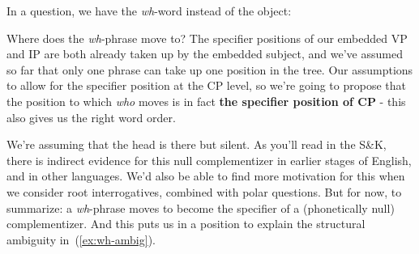 \documentclass{article}
\begin{document}
In a question, we have the \emph{wh}-word instead of the object:

\ea
    \label{wonder_who_A}
    \label{wonder_who_B}
    \z
\z

Where does the \emph{wh}-phrase move to? The specifier positions of our embedded VP and IP are both already taken up by the embedded subject, and we've assumed so far that only one phrase can take up one position in the tree. Our assumptions to allow for the specifier position at the CP level, so we're going to propose that the position to which \emph{who} moves is in fact \textbf{the specifier position of CP} - this also gives us the right word order.
\begin{exe}
\end{exe}
\vspace{-4em}
We're assuming that the head  is there but silent. As you'll read in the S\&K, there is indirect evidence for this null complementizer in earlier stages of English, and in other languages.
We'd also be able to find more motivation for this when we consider root interrogatives, combined with polar questions. But for now, to summarize:  a \emph{wh}-phrase moves to become the specifier of a (phonetically null) complementizer. And this puts us in a position to explain the structural ambiguity in~(\ref{ex:wh-ambig}).
\end{document}
